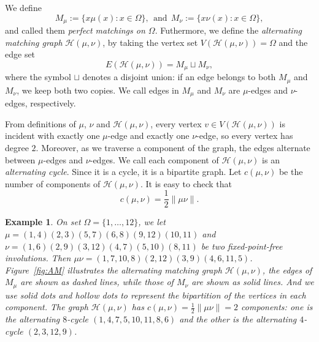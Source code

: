 \documentclass[10pt,a4paper]{amsart}
\newtheorem{example}[theorem]{Example}
\begin{document}
We define
\[
M_\mu := \{ x\mu(x) : x \in \Omega \}, ~~\mbox{and}~~M_\nu := \{ x\nu(x) : x \in \Omega \},
\]
and called them {\it perfect matchings on $\Omega$}. Futhermore, we define the {\it alternating matching graph} $\mathcal H(\mu,\nu)$, by taking the vertex set $V(\mathcal H(\mu,\nu))=\Omega$ and the edge set
\[
E(\mathcal H(\mu,\nu)) = M_\mu \sqcup M_\nu,
\]
where the symbol $\sqcup$ denotes a disjoint union: if an edge belongs to both $M_\mu$ and $M_\nu$, we keep both two copies.  We call edges in $M_\mu$ and $M_\nu$ are $\mu$-edges and $\nu$-edges, respectively.

From definitions of $\mu$, $\nu$ and $\mathcal H(\mu,\nu)$,  every vertex $v\in V(\mathcal H(\mu,\nu))$ is incident with exactly one $\mu$-edge and exactly one $\nu$-edge, so every vertex has degree $2$. Moreover, as we traverse a component of the graph, the edges alternate between $\mu$-edges and $\nu$-edges. We call each component of
$\mathcal H(\mu,\nu)$ is an {\it alternating cycle}. Since it is a cycle, it is a bipartite graph. Let $c(\mu,\nu)$ be the number of components of $\mathcal H(\mu,\nu)$.
It is easy to check that
\[
c(\mu,\nu)=\frac12 \|\mu\nu\|.
\]

\begin{example}
On set $\Omega=\{1,\ldots, 12\}$, we let $\mu=(1,4)(2,3)(5,7)(6,8)(9,12)(10,11)$ and $\nu=(1,6)(2,9)(3,12)(4,7)(5,10)(8,11)$ be two fixed-point-free involutions. Then $\mu\nu=(1,7,10,8)(2,12)(3,9)(4,6,11,5)$.
Figure~\ref{fig:AM} illustrates the alternating matching graph $\mathcal H(\mu,\nu)$, the edges of $M_\mu$ are shown as dashed lines, while those of $M_{\nu}$ are shown as  solid lines. And we use solid dots and hollow dots to represent the bipartition of the vertices in each component. The graph $\mathcal H(\mu,\nu)$ has
$c(\mu,\nu)=\frac12\lVert\mu\nu\rVert=2$ components: one is the alternating $8$-cycle $(1,4,7,5,10,11,8,6)$ and the other is the alternating $4$-cycle $(2,3,12,9)$.
\end{example}
\end{document}

